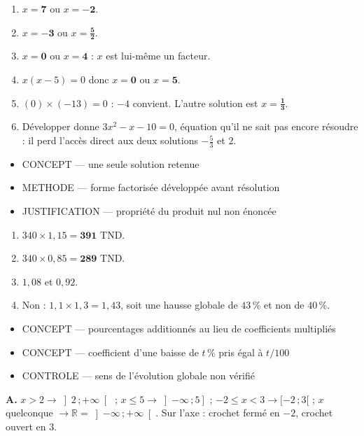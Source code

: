 \documentclass[10pt,a4paper]{article}
\begin{document}
\begin{enumerate}
\item $x=\mathbf{7}$ ou $x=\mathbf{-2}$.
\item $x=\mathbf{-3}$ ou $x=\mathbf{\frac52}$.
\item $x=\mathbf{0}$ ou $x=\mathbf{4}$ : $x$ est lui-même un facteur.
\item $x(x-5)=0$ donc $x=\mathbf{0}$ ou $x=\mathbf{5}$.
\item $(0)\times(-13)=0$ : $-4$ convient. L'autre solution est $x=\mathbf{\frac13}$.
\item Développer donne $3x^2-x-10=0$, équation qu'il ne sait pas encore résoudre : il perd l'accès direct aux deux solutions $-\frac53$ et $2$.
\end{enumerate}
\begin{itemize}
\item \textsc{CONCEPT} --- une seule solution retenue
\item \textsc{METHODE} --- forme factorisée développée avant résolution
\item \textsc{JUSTIFICATION} --- propriété du produit nul non énoncée
\end{itemize}
\begin{enumerate}
\item $340\times 1{,}15 = \mathbf{391}$ TND.
\item $340\times 0{,}85 = \mathbf{289}$ TND.
\item $1{,}08$ et $0{,}92$.
\item Non : $1{,}1\times 1{,}3 = 1{,}43$, soit une hausse globale de $43\,\%$ et non de $40\,\%$.
\end{enumerate}
\begin{itemize}
\item \textsc{CONCEPT} --- pourcentages additionnés au lieu de coefficients multipliés
\item \textsc{CONCEPT} --- coefficient d'une baisse de $t\,\%$ pris égal à $t/100$
\item \textsc{CONTROLE} --- sens de l'évolution globale non vérifié
\end{itemize}

\textbf{A.} $x>2 \to \left]2\,;+\infty\right[$ ; $x\le 5 \to \left]-\infty\,;5\right]$ ;
$-2\le x<3 \to [-2\,;3[$ ; $x$ quelconque $\to \mathbb{R}=\left]-\infty\,;+\infty\right[$.
Sur l'axe : crochet fermé en $-2$, crochet ouvert en $3$.
\end{document}
